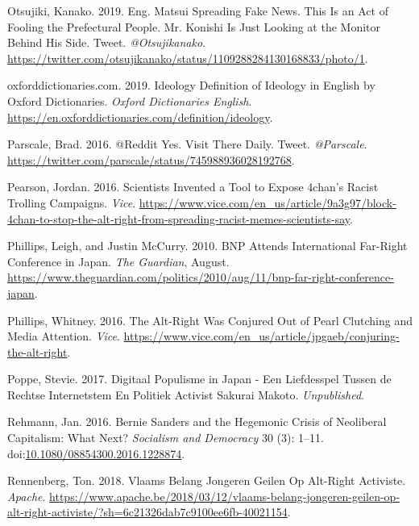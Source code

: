 \documentclass[10pt,british,A4paper,,openany]{memoir}
\begin{document}
\hypertarget{ref-otsujiki_eng._2019}{}
Otsujiki, Kanako. 2019. Eng. Matsui Spreading Fake News. This Is an Act
of Fooling the Prefectural People. Mr. Konishi Is Just Looking at the
Monitor Behind His Side. Tweet. \emph{@Otsujikanako}.
\url{https://twitter.com/otsujikanako/status/1109288284130168833/photo/1}.

\hypertarget{ref-oxforddictionaries.com_ideology_2019}{}
oxforddictionaries.com. 2019. Ideology Definition of Ideology in English
by Oxford Dictionaries. \emph{Oxford Dictionaries English}.
\url{https://en.oxforddictionaries.com/definition/ideology}.

\hypertarget{ref-parscale_reddit_2016}{}
Parscale, Brad. 2016. @Reddit Yes. Visit There Daily. Tweet.
\emph{@Parscale}.
\url{https://twitter.com/parscale/status/745988936028192768}.

\hypertarget{ref-pearson_scientists_2016}{}
Pearson, Jordan. 2016. Scientists Invented a Tool to Expose 4chan's
Racist Trolling Campaigns. \emph{Vice}.
\url{https://www.vice.com/en_us/article/9a3g97/block-4chan-to-stop-the-alt-right-from-spreading-racist-memes-scientists-say}.

\hypertarget{ref-phillips_bnp_2010}{}
Phillips, Leigh, and Justin McCurry. 2010. BNP Attends International
Far-Right Conference in Japan. \emph{The Guardian}, August.
\url{https://www.theguardian.com/politics/2010/aug/11/bnp-far-right-conference-japan}.

\hypertarget{ref-phillips_alt-right_2016}{}
Phillips, Whitney. 2016. The Alt-Right Was Conjured Out of Pearl
Clutching and Media Attention. \emph{Vice}.
\url{https://www.vice.com/en_us/article/jpgaeb/conjuring-the-alt-right}.

\hypertarget{ref-poppe_digitaal_2017}{}
Poppe, Stevie. 2017. Digitaal Populisme in Japan - Een Liefdesspel
Tussen de Rechtse Internetstem En Politiek Activist Sakurai Makoto.
\emph{Unpublished}.

\hypertarget{ref-rehmann_bernie_2016}{}
Rehmann, Jan. 2016. Bernie Sanders and the Hegemonic Crisis of
Neoliberal Capitalism: What Next? \emph{Socialism and Democracy} 30 (3):
1--11.
doi:\href{https://doi.org/10.1080/08854300.2016.1228874}{10.1080/08854300.2016.1228874}.

\hypertarget{ref-rennenberg_vlaams_2018}{}
Rennenberg, Ton. 2018. Vlaams Belang Jongeren Geilen Op Alt-Right
Activiste. \emph{Apache}.
\url{https://www.apache.be/2018/03/12/vlaams-belang-jongeren-geilen-op-alt-right-activiste/?sh=6c21326dab7c9100ee6fb-40021154}.
\end{document}
